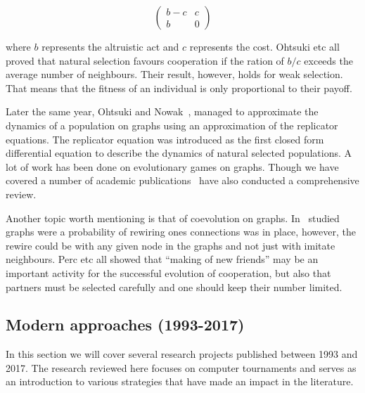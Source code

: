 \documentclass{article}
\theoremstyle{definition}
\begin{document}
\begin{equation} \label{eq:the_pd_payoffs}
    \begin{pmatrix}
        b - c & c \\ b & 0
    \end{pmatrix}
\end{equation}

where \(b\) represents the altruistic act and \(c\) represents the cost.
Ohtsuki etc all proved that natural selection favours cooperation if
the ration of  \(b/c\) exceeds the average number of neighbours.
Their result, however, holds for weak selection. That means that the fitness of
an individual is only proportional to their payoff.

Later the same year, Ohtsuki and Nowak~\cite{Ohtsuki2006replicator},
managed to approximate the dynamics of a population on graphs using an approximation of the
replicator equations. The replicator equation was introduced as the first closed
form differential equation to describe the dynamics of natural selected populations.
A lot of work has been done on evolutionary games on graphs. Though we have covered
a number of academic publications~\cite{szabo2007} have also conducted a comprehensive
review.

Another topic worth mentioning is that of coevolution on graphs. In~\cite{Perc2011}
studied graphs were a probability of rewiring ones connections was in place,
however, the rewire could be with any given node in the graphs and not just
with imitate neighbours. Perc etc all showed that ``making of new friends'' may
be an important activity for the successful evolution of cooperation,
but also that partners must be selected carefully and one should keep their number
limited.

\subsection{Modern approaches (1993-2017)}\label{section:modern_approaches}

In this section we will cover several
research projects published between 1993 and 2017. The research reviewed here focuses
on computer tournaments and serves as an introduction to various strategies that
have made an impact in the literature.
\end{document}
